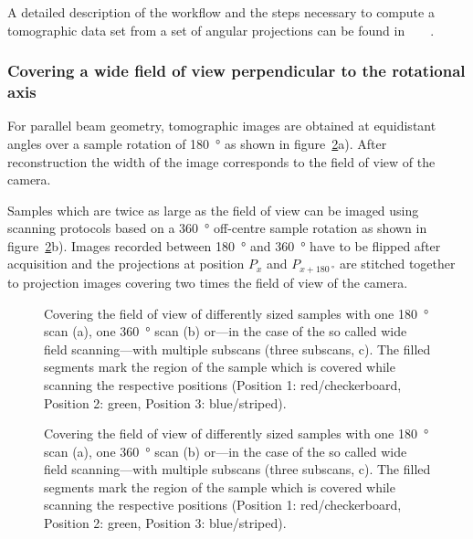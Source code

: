 A detailed description of the workflow and the steps necessary to compute a tomographic data set from a set of angular projections can be found in%
\ifhtml
	~\citet{Hintermueller2009}
\else
	~
\fi%
.

\subsubsection{Covering a wide field of view perpendicular to the rotational axis}%
For parallel beam geometry, tomographic images are obtained at equidistant angles over a sample rotation of \SI{180}{\degree} as shown in figure~\ref{fig:scanning-possibilities}a). After reconstruction the width of the image corresponds to the field of view of the camera.

Samples which are twice as large as the field of view can be imaged using scanning protocols based on a \SI{360}{\degree} off-centre sample rotation as shown in figure~\ref{fig:scanning-possibilities}b). Images recorded between \SI{180}{\degree} and \SI{360}{\degree} have to be flipped after acquisition and the projections at position $P_{x}$ and $P_{x+\SI{180}{\degree}}$ are stitched together to projection images covering two times the field of view of the camera.

\ifiucr
	\begin{figure}
		\centering
		\caption{Covering the field of view of differently sized samples with one \SI{180}{\degree} scan (a), one \SI{360}{\degree} scan (b) or---in the case of the so called wide field scanning---with multiple subscans (three subscans, c). The filled segments mark the region of the sample which is covered while scanning the respective positions (Position 1: red/checkerboard, Position 2: green, Position 3: blue/striped).}%
		\label{fig:scanning-possibilities}%
	\end{figure}
\else
	\begin{figure}
		\label{subfig:scanning-possibilities}%
		\caption{Covering the field of view of differently sized samples with one \SI{180}{\degree} scan (a), one \SI{360}{\degree} scan (b) or---in the case of the so called wide field scanning---with multiple subscans (three subscans, c). The filled segments mark the region of the sample which is covered while scanning the respective positions (Position 1: red/checkerboard, Position 2: green, Position 3: blue/striped).}%
		\label{fig:scanning-possibilities}%
	\end{figure}
\fi

